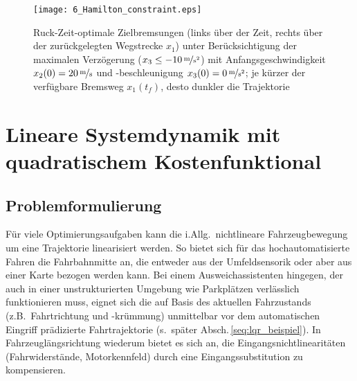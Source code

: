 %
%
%
\begin{figure}[ht]
\centering

\renewcommand{\matlabtextA}{\normalsize }
	\def\ylabelV{$x_2$ in $\unitfrac{m}{s}$}
	\def\ylabelA{$x_3$ in $\unitfrac{m}{s^2}$}
	\def\xlabelT{$t$ in $\unit{s}$}
	\def\xlabelX{$x_1$ in $\unit{m}$}
	\centering
  	\texttt{[image: 6\_Hamilton\_constraint.eps]}
  \caption[Ruck-Zeit-optimale Zielbremsungen]{Ruck-Zeit-optimale Zielbremsungen (links über der Zeit, rechts über der zurückgelegten Wegstrecke $x_1$) unter Berücksichtigung der maximalen Verzögerung ($x_3 \leq -\unitfrac[10]{m}{s^2}$) mit Anfangsgeschwindigkeit $x_2(0) = \unitfrac[20]{m}{s}$ und -beschleunigung $x_3(0) = \unitfrac[0]{m}{s^2}$; je kürzer der verfügbare Bremsweg $x_1(t_f)$, desto dunkler die Trajektorie}
    \label{fig:poly_mit_unb}
\end{figure}


	\section{Lineare Systemdynamik mit quadratischem Kostenfunktional} \label{sec:lqr}
\subsection{Problemformulierung}
	Für viele Optimierungsaufgaben kann die i.Allg.\ nichtlineare Fahrzeugbewegung um eine Trajektorie linearisiert werden. So bietet sich für das hochautomatisierte Fahren die Fahrbahnmitte an, die entweder aus der Umfeldsensorik oder aber aus einer Karte bezogen werden kann. Bei einem Ausweichassistenten hingegen, der auch in einer unstrukturierten Umgebung wie Parkplätzen verlässlich funktionieren muss, eignet sich die auf Basis des aktuellen Fahrzustands (z.B.\ Fahrtrichtung und -krümmung) unmittelbar vor dem automatischen Eingriff prädizierte Fahrtrajektorie (s.\ später Absch.\,\ref{seq:lqr_beispiel}). In Fahrzeuglängsrichtung wiederum bietet es sich an, die Eingangsnichtlinearitäten (Fahrwiderstände, Motorkennfeld) durch eine Eingangssubstitution zu kompensieren. 
	
